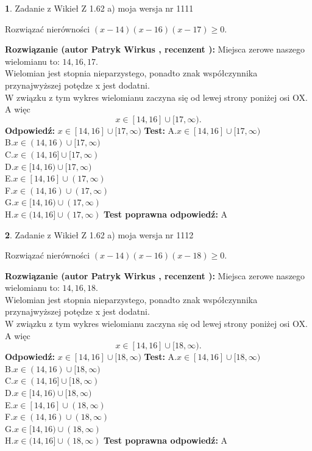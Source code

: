 \documentclass[12pt, a4paper]{article}
\theoremstyle{definition} %
\newtheorem{zad}{}
\newcommand{\zadStart}[1]{\begin{zad}#1\newline}
\newcommand{\zadStop}{\end{zad}}
\newcommand{\rozwStart}[2]{\noindent \textbf{Rozwiązanie (autor #1 , recenzent #2): }\newline}
\newcommand{\rozwStop}{\newline}
\newcommand{\odpStart}{\noindent \textbf{Odpowiedź:}\newline}
\newcommand{\odpStop}{\newline}
\newcommand{\testStart}{\noindent \textbf{Test:}\newline}
\newcommand{\testStop}{\newline}
\newcommand{\kluczStart}{\noindent \textbf{Test poprawna odpowiedź:}\newline}
\newcommand{\kluczStop}{\newline}
\begin{document}
\zadStart{Zadanie z Wikieł Z 1.62 a) moja wersja nr 1111}

Rozwiązać nierówności $(x-14)(x-16)(x-17)\ge0$.
\zadStop
\rozwStart{Patryk Wirkus}{}
Miejsca zerowe naszego wielomianu to: $14, 16, 17$.\\
Wielomian jest stopnia nieparzystego, ponadto znak współczynnika przy\linebreak najwyższej potędze x jest dodatni.\\ W związku z tym wykres wielomianu zaczyna się od lewej strony poniżej osi OX. A więc $$x \in [14,16] \cup [17,\infty).$$
\rozwStop
\odpStart
$x \in [14,16] \cup [17,\infty)$
\odpStop
\testStart
A.$x \in [14,16] \cup [17,\infty)$\\
B.$x \in (14,16) \cup [17,\infty)$\\
C.$x \in (14,16] \cup [17,\infty)$\\
D.$x \in [14,16) \cup [17,\infty)$\\
E.$x \in [14,16] \cup (17,\infty)$\\
F.$x \in (14,16) \cup (17,\infty)$\\
G.$x \in [14,16) \cup (17,\infty)$\\
H.$x \in (14,16] \cup (17,\infty)$
\testStop
\kluczStart
A
\kluczStop



\zadStart{Zadanie z Wikieł Z 1.62 a) moja wersja nr 1112}

Rozwiązać nierówności $(x-14)(x-16)(x-18)\ge0$.
\zadStop
\rozwStart{Patryk Wirkus}{}
Miejsca zerowe naszego wielomianu to: $14, 16, 18$.\\
Wielomian jest stopnia nieparzystego, ponadto znak współczynnika przy\linebreak najwyższej potędze x jest dodatni.\\ W związku z tym wykres wielomianu zaczyna się od lewej strony poniżej osi OX. A więc $$x \in [14,16] \cup [18,\infty).$$
\rozwStop
\odpStart
$x \in [14,16] \cup [18,\infty)$
\odpStop
\testStart
A.$x \in [14,16] \cup [18,\infty)$\\
B.$x \in (14,16) \cup [18,\infty)$\\
C.$x \in (14,16] \cup [18,\infty)$\\
D.$x \in [14,16) \cup [18,\infty)$\\
E.$x \in [14,16] \cup (18,\infty)$\\
F.$x \in (14,16) \cup (18,\infty)$\\
G.$x \in [14,16) \cup (18,\infty)$\\
H.$x \in (14,16] \cup (18,\infty)$
\testStop
\kluczStart
A
\kluczStop
\end{document}
